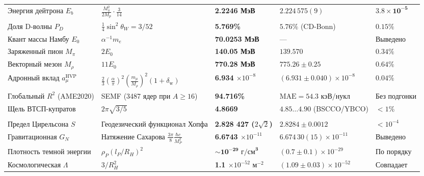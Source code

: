 \documentclass[11pt,a4paper]{article}
\theoremstyle{definition}
\theoremstyle{remark}
\begin{document}
\begin{xltabular}{\textwidth}{>{\raggedright\arraybackslash}p{3.2cm} X >{\centering\arraybackslash}p{2.7cm} >{\centering\arraybackslash}p{3.0cm} >{\raggedleft\arraybackslash}p{2.1cm}}
 \\
\midrule
Энергия дейтрона $E_b$ & $\frac{M_\pi^2}{2 M_p} \cdot \frac{3}{14}$ & \textbf{2.2246 МэВ} & $2.224\,575(9)$ & $\mathbf{3.8 \times 10^{-5}}$ \\
Доля D-волны $P_D$ & $\frac{1}{4}\sin^2\theta_W = 3/52$ & \textbf{5.769\%} & $5.76\%$ (CD-Bonn) & $0.15\%$ \\
Квант массы Намбу $E_0$ & $\alpha^{-1} m_e$ & \textbf{70.0253 МэВ} & --- & Выведено \\
Заряженный пион $M_\pi$ & $2 E_0$ & \textbf{140.05 МэВ} & $139.570$ & $0.34\%$ \\
Векторный мезон $M_\rho$ & $11 E_0$ & \textbf{770.28 МэВ} & $775.26 \pm 0.25$ & $0.64\%$ \\
Адронный вклад $a_\mu^{\mathrm{HVP}}$ & $\frac{2}{3}(\frac{\alpha}{\pi})^2(\frac{m_\mu}{M_\rho})^2(1+\delta_{\mathrm{w}})$ & \textbf{6.934 $\times 10^{-8}$} & $(6.931 \pm 0.040) \times 10^{-8}$ & $\mathbf{0.04\%}$ \\
Глобальный $R^2$ (AME2020) & SEMF (3487 ядер при $A \ge 16$) & \textbf{94.716\%} & $\text{MAE} = 54.3\text{ кэВ/нукл}$ & Без подгонки \\
Щель ВТСП-купратов & $2\pi\sqrt{3/5}$ & \textbf{4.8669} & $4.85\dots 4.90$ (BSCCO/YBCO) & $< 1\%$ \\
\midrule

 \\
\midrule
Предел Цирельсона $S$ & Геодезический функционал Хопфа & \textbf{2.828 427 ($2\sqrt{2}$)} & $2.8284 \pm 0.0012$ & $< 10^{-4}$ \\
Гравитационная $G_N$ & Натяжение Сахарова $\frac{3\pi}{8}\frac{\hbar c}{M_P^2}$ & \textbf{6.6743 $\times 10^{-11}$} & $6.674\,30(15) \times 10^{-11}$ & Выведено \\
Плотность темной энергии & $\rho_P (l_P / R_H)^2$ & $\mathbf{\sim 10^{-29}\text{ г/см}^3}$ & $(0.7 \pm 0.1)\times 10^{-29}$ & По порядку \\
Космологическая $\Lambda$ & $3 / R_H^2$ & \textbf{1.1 $\times 10^{-52}\text{ м}^{-2}$} & $(1.09 \pm 0.03)\times 10^{-52}$ & Совпадает \\

\end{xltabular}
\endgroup
\vspace{2mm}
\end{document}
